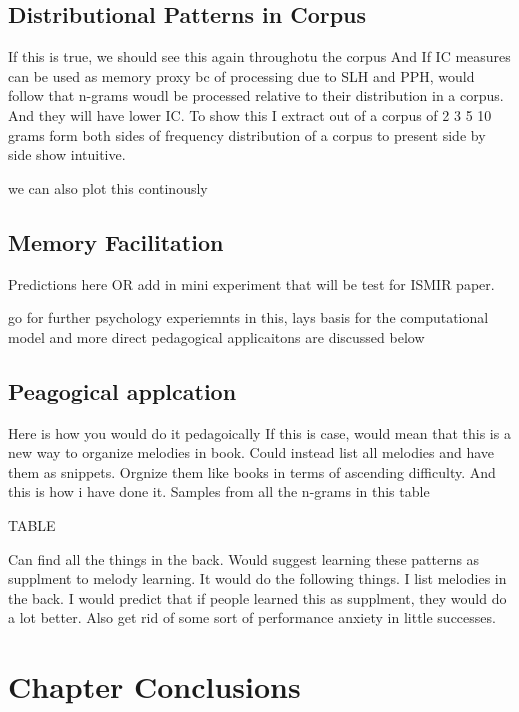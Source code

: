 \documentclass[]{book}
\begin{document}
\hypertarget{distributional-patterns-in-corpus}{%
\subsection{Distributional Patterns in Corpus}\label{distributional-patterns-in-corpus}}

If this is true, we should see this again throughotu the corpus
And If IC measures can be used as memory proxy bc of processing due to SLH and PPH, would follow that n-grams woudl be processed relative to their distribution in a corpus.
And they will have lower IC.
To show this I extract out of a corpus of 2 3 5 10 grams form both sides of frequency distribution of a corpus to present side by side show intuitive.

we can also plot this continously

\hypertarget{memory-facilitation}{%
\subsection{Memory Facilitation}\label{memory-facilitation}}

Predictions here OR add in mini experiment that will be test for ISMIR paper.

go for further psychology experiemnts in this,
lays basis for the computational model
and more direct pedagogical applicaitons are discussed below

\hypertarget{peagogical-applcation}{%
\subsection{Peagogical applcation}\label{peagogical-applcation}}

Here is how you would do it pedagoically
If this is case, would mean that this is a new way to organize melodies in book.
Could instead list all melodies and have them as snippets.
Orgnize them like books in terms of ascending difficulty.
And this is how i have done it.
Samples from all the n-grams in this table

TABLE

Can find all the things in the back.
Would suggest learning these patterns as supplment to melody learning.
It would do the following things.
I list melodies in the back.
I would predict that if people learned this as supplment, they would do a lot better.
Also get rid of some sort of performance anxiety in little successes.

\hypertarget{chapter-conclusions}{%
\section{Chapter Conclusions}\label{chapter-conclusions}}
\end{document}
